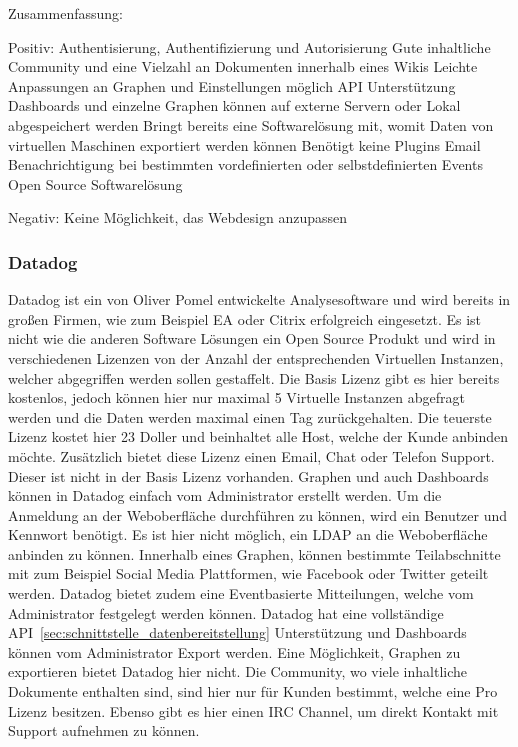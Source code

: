Zusammenfassung:

\begin{outline}
  Positiv:
  \1 Authentisierung, Authentifizierung und Autorisierung
  \1 Gute inhaltliche Community und eine Vielzahl an Dokumenten innerhalb
  eines Wikis
  \1 Leichte Anpassungen an Graphen und Einstellungen möglich
  \1 API Unterstützung
  \1 Dashboards und einzelne Graphen können auf externe Servern oder Lokal
  abgespeichert werden
  \1 Bringt bereits eine Softwarelösung mit, womit Daten von virtuellen
  Maschinen exportiert werden können
  \1 Benötigt keine Plugins
  \1 Email Benachrichtigung bei bestimmten vordefinierten oder selbstdefinierten
  Events
  \1 Open Source Softwarelösung


  Negativ:
  \1 Keine Möglichkeit, das Webdesign anzupassen
\end{outline}

\subsubsection{Datadog}
\label{subsubsec:datadog}
Datadog ist ein von Oliver Pomel entwickelte Analysesoftware und wird bereits
in großen Firmen, wie zum Beispiel EA oder Citrix erfolgreich eingesetzt. Es
ist nicht wie die anderen Software Lösungen ein Open Source Produkt und wird in
verschiedenen Lizenzen von der Anzahl der entsprechenden Virtuellen Instanzen,
welcher abgegriffen werden sollen gestaffelt. Die Basis Lizenz gibt es hier
bereits kostenlos, jedoch können hier nur maximal 5 Virtuelle Instanzen
abgefragt werden und die Daten werden maximal einen Tag zurückgehalten. Die
teuerste Lizenz kostet hier 23 Doller und beinhaltet alle Host, welche der
Kunde anbinden möchte. Zusätzlich bietet diese Lizenz einen Email, Chat oder
Telefon Support. Dieser ist nicht in der Basis Lizenz vorhanden. Graphen und
auch Dashboards können in Datadog einfach vom Administrator erstellt werden. Um
die Anmeldung an der Weboberfläche durchführen zu können, wird ein Benutzer und
Kennwort benötigt. Es ist hier nicht möglich, ein LDAP an die Weboberfläche
anbinden zu können. Innerhalb eines Graphen, können bestimmte Teilabschnitte
mit zum Beispiel Social Media Plattformen, wie Facebook oder Twitter geteilt
werden.  Datadog bietet zudem eine Eventbasierte Mitteilungen, welche vom
Administrator festgelegt werden können. Datadog hat eine vollständige
API~\ref{sec:schnittstelle_datenbereitstellung} Unterstützung und Dashboards
können vom Administrator Export werden. Eine Möglichkeit, Graphen zu
exportieren bietet Datadog hier nicht. Die Community, wo viele inhaltliche
Dokumente enthalten sind, sind hier nur für Kunden bestimmt, welche eine Pro
Lizenz besitzen. Ebenso gibt es hier einen \gls{IRC Channel}, um direkt Kontakt
mit Support aufnehmen zu können.

